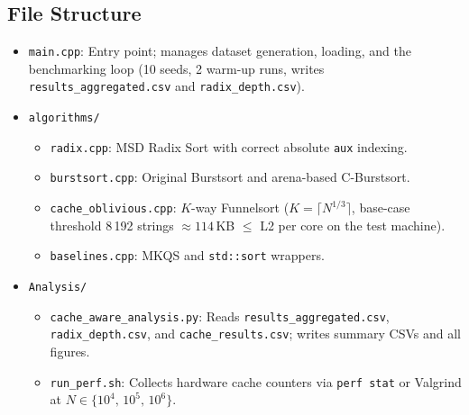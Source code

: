 \documentclass{article}
\begin{document}
\subsection{File Structure}
\begin{itemize}
  \item \texttt{main.cpp}: Entry point; manages dataset generation, loading, and
        the benchmarking loop (10 seeds, 2 warm-up runs, writes
        \texttt{results\_aggregated.csv} and \texttt{radix\_depth.csv}).
  \item \texttt{algorithms/}
    \begin{itemize}
      \item \texttt{radix.cpp}: MSD Radix Sort with correct absolute
            \texttt{aux} indexing.
      \item \texttt{burstsort.cpp}: Original Burstsort and arena-based
            C-Burstsort.
      \item \texttt{cache\_oblivious.cpp}: $K$-way Funnelsort
            ($K = \lceil N^{1/3} \rceil$, base-case threshold 8\,192 strings
            $\approx 114$\,KB $\le$ L2 per core on the test machine).
      \item \texttt{baselines.cpp}: MKQS and \texttt{std::sort} wrappers.
    \end{itemize}
  \item \texttt{Analysis/}
    \begin{itemize}
      \item \texttt{cache\_aware\_analysis.py}: Reads
            \texttt{results\_aggregated.csv}, \texttt{radix\_depth.csv}, and
            \texttt{cache\_results.csv}; writes summary CSVs and all figures.
      \item \texttt{run\_perf.sh}: Collects hardware cache counters via
            \texttt{perf stat} or Valgrind at
            $N \in \{10^4,\,10^5,\,10^6\}$.
    \end{itemize}
\end{itemize}
\end{document}
